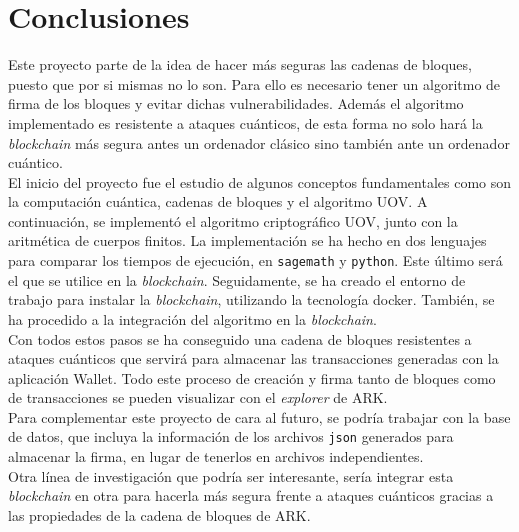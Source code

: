 \chapter{Conclusiones}

Este proyecto parte de la idea de hacer más seguras las cadenas de bloques, puesto que por si mismas no lo son. Para ello es necesario tener un algoritmo de firma de los bloques y evitar dichas vulnerabilidades. Además el algoritmo implementado es resistente a ataques cuánticos, de esta forma no solo hará la \textit{blockchain} más segura antes un ordenador clásico sino también ante un ordenador cuántico.\\

El inicio del proyecto fue el estudio de algunos conceptos fundamentales como son la computación cuántica, cadenas de bloques y el algoritmo UOV. A continuación, se implementó el algoritmo criptográfico UOV, junto con la aritmética de cuerpos finitos. La implementación se ha hecho en dos lenguajes para comparar los tiempos de ejecución, en \texttt{sagemath} y \texttt{python}. Este último será el que se utilice en la \textit{blockchain}. Seguidamente, se ha creado el entorno de trabajo para instalar la \textit{blockchain}, utilizando la tecnología docker. También, se ha procedido a la integración del algoritmo en la \textit{blockchain}.\\

Con todos estos pasos se ha conseguido una cadena de bloques resistentes a ataques cuánticos que servirá para almacenar las transacciones generadas con la aplicación Wallet. Todo este proceso de creación y firma tanto de bloques como de transacciones se pueden visualizar con el \textit{explorer} de ARK.\\


Para complementar este proyecto de cara al futuro, se podría trabajar con la base de datos, que incluya la información de los archivos \texttt{json} generados para almacenar la firma, en lugar de tenerlos en archivos independientes.\\

Otra línea de investigación que podría ser interesante, sería integrar esta \textit{blockchain} en otra para hacerla más segura frente a ataques cuánticos gracias a las propiedades de la cadena de bloques de ARK.\\

